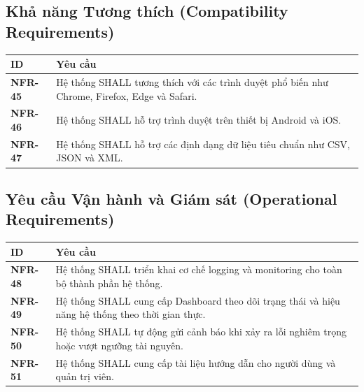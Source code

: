 \documentclass[12pt, a4paper]{article}
\begin{document}
\subsection{Khả năng Tương thích (Compatibility Requirements)}

\begin{table}[H]
    \centering
    \renewcommand{\arraystretch}{1.3}

    \begin{tabularx}{\textwidth}{|l|X|}
        \hline
        \rowcolor{gray!10}
        \textbf{ID}     & \textbf{Yêu cầu}                                                                             \\
        \hline
        \textbf{NFR-45} & Hệ thống SHALL tương thích với các trình duyệt phổ biến như Chrome, Firefox, Edge và Safari. \\
        \hline
        \textbf{NFR-46} & Hệ thống SHALL hỗ trợ trình duyệt trên thiết bị Android và iOS.                              \\
        \hline
        \textbf{NFR-47} & Hệ thống SHALL hỗ trợ các định dạng dữ liệu tiêu chuẩn như CSV, JSON và XML.                 \\
        \hline
    \end{tabularx}

\end{table}

\subsection{Yêu cầu Vận hành và Giám sát (Operational Requirements)}

\begin{table}[H]
    \centering
    \renewcommand{\arraystretch}{1.3}

    \begin{tabularx}{\textwidth}{|l|X|}
        \hline
        \rowcolor{gray!10}
        \textbf{ID}     & \textbf{Yêu cầu}                                                                                 \\
        \hline
        \textbf{NFR-48} & Hệ thống SHALL triển khai cơ chế logging và monitoring cho toàn bộ thành phần hệ thống.          \\
        \hline
        \textbf{NFR-49} & Hệ thống SHALL cung cấp Dashboard theo dõi trạng thái và hiệu năng hệ thống theo thời gian thực. \\
        \hline
        \textbf{NFR-50} & Hệ thống SHALL tự động gửi cảnh báo khi xảy ra lỗi nghiêm trọng hoặc vượt ngưỡng tài nguyên.     \\
        \hline
        \textbf{NFR-51} & Hệ thống SHALL cung cấp tài liệu hướng dẫn cho người dùng và quản trị viên.                      \\
        \hline
    \end{tabularx}

\end{table}
\end{document}
